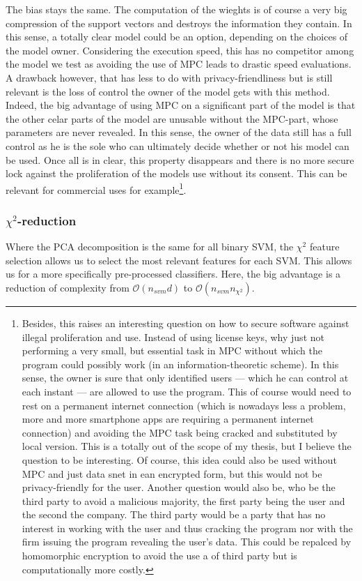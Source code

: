 \begin{itemize}
    The bias stays the same. The computation of the wieghts is of course a very big compression of the support vectors and destroys the information they contain. In this sense, a totally clear model could be an option, depending on the choices of the model owner. Considering the execution speed, this has no competitor among the model we test as avoiding the use of MPC leads to drastic speed evaluations. A drawback however, that has less to do with privacy-friendliness but is still relevant is the loss of control the owner of the model gets with this method. Indeed, the big advantage of using MPC on a significant part of the model is that the other celar parts of the model are unusable without the MPC-part, whose parameters are never revealed. In this sense, the owner of the data still has a full control as he is the sole who can ultimately decide whether or not his model can be used. Once all is in clear, this property disappears and there is no more secure lock against the proliferation of the models use without its consent. This can be relevant for commercial uses for example\footnote{Besides, this raises an interesting question on how to secure software against illegal proliferation and use. Instead of using license keys, why just not performing a very small, but essential task in MPC without which the program could possibly work (in an information-theoretic scheme). In this sense, the owner is sure that only identified users --- which he can control at each instant --- are allowed to use the program. This of course would need to rest on a permanent internet connection (which is nowadays less a problem, more and more smartphone apps are requiring a permanent internet connection) and avoiding the MPC task being cracked and substituted by local version. This is a totally out of the scope of my thesis, but I believe the question to be interesting. Of course, this idea could also be used without MPC and just data snet in ean encrypted form, but this would not be privacy-friendly for the user. Another question would also be, who be the third party to avoid a malicious majority, the first party being the user and the second the company. The third party would be a party that has no interest in working with the user and thus cracking the program nor with the firm issuing the program revealing the user's data. This could be repalced by homomorphic encryption to avoid the use a of third party but is computationally more  costly.}.
\end{itemize}

\subsubsection{$\chi^2$-reduction}
Where the PCA decomposition is the same for all binary SVM, the $\chi^2$ feature selection allows us to select the most relevant features for each SVM. This allows us for a more specifically pre-processed classifiers. Here, the big advantage is a reduction of complexity from $\mathcal{O}(n_{svm}d)$ to $\mathcal{O}(n_{svm}n_{\chi^2})$.

